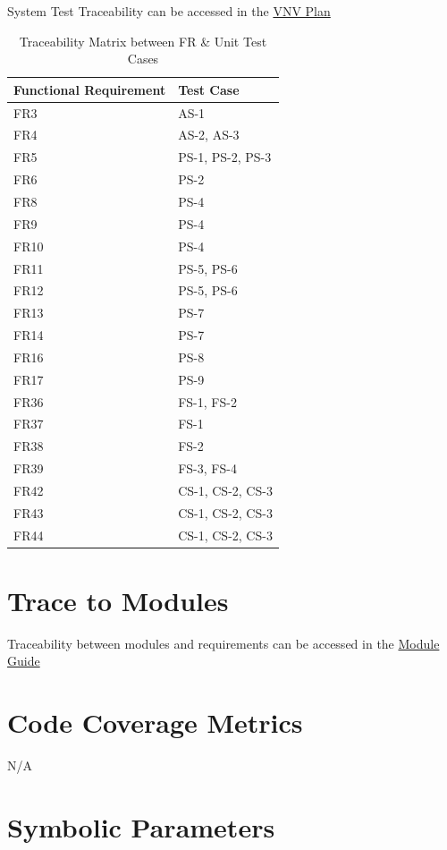 \documentclass[12pt, titlepage]{article}
\begin{document}
	System Test Traceability can be accessed in the \href{https://github.com/RutheniumVI/UnderTree/blob/main/docs/VnVPlan/VnVPlan.pdf}{VNV Plan}
	
	\begin{longtable}{|l|l|}
		\caption{Traceability Matrix between FR \& Unit Test Cases}\\
		\hline
		Functional Requirement &  Test Case\\
		\hline
		FR3  & AS-1 \\
		FR4  & AS-2, AS-3 \\
		FR5  & PS-1, PS-2, PS-3\\
		FR6  & PS-2\\
		FR8  & PS-4\\
		FR9  & PS-4\\
		FR10  & PS-4\\
		FR11  & PS-5, PS-6\\
		FR12  & PS-5, PS-6\\
		FR13  & PS-7\\
		FR14  & PS-7\\
		FR16  & PS-8 \\
		FR17  & PS-9\\
		FR36  & FS-1, FS-2\\
		FR37  & FS-1\\
		FR38  & FS-2\\
		FR39  & FS-3, FS-4\\
		FR42  & CS-1, CS-2, CS-3\\
		FR43  & CS-1, CS-2, CS-3\\
		FR44  & CS-1, CS-2, CS-3\\
		\hline
	\end{longtable}
	
	\section{Trace to Modules}
	
	Traceability between modules and requirements can be accessed in the \href{https://github.com/RutheniumVI/UnderTree/blob/main/docs/Design/MG/MG.pdf}{Module Guide}
	
	\section{Code Coverage Metrics}
	
	N/A
	
	\newpage
	\section{Symbolic Parameters}
	
\end{document}
